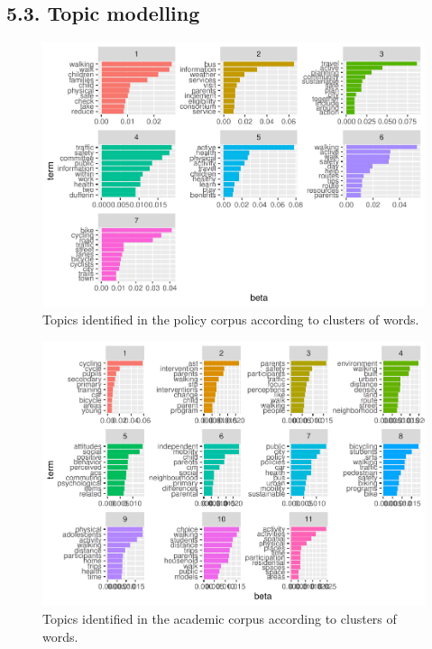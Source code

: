 \documentclass[]{elsarticle} %
\begin{document}
\hypertarget{topic-modelling-1}{%
\subsection{5.3. Topic modelling}\label{topic-modelling-1}}

\begin{figure}
\includegraphics[width=1\linewidth]{AST-Framing-Ontario_files/figure-latex/policy-terms-1} \caption{\label{fig:policy-terms}Topics identified in the policy corpus according to clusters of words.}\label{fig:policy-terms}
\end{figure}

\begin{figure}
\includegraphics[width=1\linewidth]{AST-Framing-Ontario_files/figure-latex/academic-terms-1} \caption{\label{fig:academic-terms}Topics identified in the academic corpus according to clusters of words.}\label{fig:academic-terms}
\end{figure}
\end{document}

